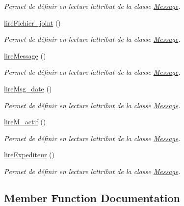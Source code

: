 \begin{DoxyCompactItemize}
\begin{DoxyCompactList}\small\item\em Permet de définir en lecture l\textquotesingle{}attribut de la classe \hyperlink{class_message}{Message}. \end{DoxyCompactList}\item 
\hyperlink{class_message_a2f6feaebdadcde8720051b595a7d1cd2}{lire\+Fichier\+\_\+joint} ()
\begin{DoxyCompactList}\small\item\em Permet de définir en lecture l\textquotesingle{}attribut de la classe \hyperlink{class_message}{Message}. \end{DoxyCompactList}\item 
\hyperlink{class_message_a5e7093a4928f769ae1cea698165ec5cd}{lire\+Message} ()
\begin{DoxyCompactList}\small\item\em Permet de définir en lecture l\textquotesingle{}attribut de la classe \hyperlink{class_message}{Message}. \end{DoxyCompactList}\item 
\hyperlink{class_message_ae8c85c209076411201029393c04831e6}{lire\+Msg\+\_\+date} ()
\begin{DoxyCompactList}\small\item\em Permet de définir en lecture l\textquotesingle{}attribut de la classe \hyperlink{class_message}{Message}. \end{DoxyCompactList}\item 
\hyperlink{class_message_a009389efe8aa3dcf62a862b2a1bec69d}{lire\+M\+\_\+actif} ()
\begin{DoxyCompactList}\small\item\em Permet de définir en lecture l\textquotesingle{}attribut de la classe \hyperlink{class_message}{Message}. \end{DoxyCompactList}\item 
\hyperlink{class_message_a3d577d3c28a1e766278db62f7ad78818}{lire\+Expediteur} ()
\begin{DoxyCompactList}\small\item\em Permet de définir en lecture l\textquotesingle{}attribut de la classe \hyperlink{class_message}{Message}. \end{DoxyCompactList}\end{DoxyCompactItemize}


\subsection{Member Function Documentation}
\mbox{\label{class_message_a99962a0640e579ae666d8ea47fafe252}} 
